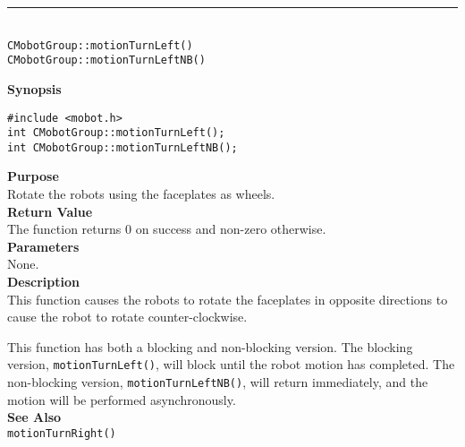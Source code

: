 \noindent
\vspace{5pt}
\rule{4.5in}{0.015in}\\
\noindent
{\LARGE \texttt{CMobotGroup::motionTurnLeft()}}\\
{\LARGE \texttt{CMobotGroup::motionTurnLeftNB()}}\\
{}

\noindent
{\bf Synopsis}
\begin{verbatim}
#include <mobot.h>
int CMobotGroup::motionTurnLeft();
int CMobotGroup::motionTurnLeftNB();
\end{verbatim}

\noindent
{\bf Purpose}\\
Rotate the robots using the faceplates as wheels.\\

\noindent
{\bf Return Value}\\
The function returns 0 on success and non-zero otherwise.\\

\noindent
{\bf Parameters}\\
None.\\

\noindent
{\bf Description}\\
This function causes the robots to rotate the faceplates in opposite directions
to cause the robot to rotate counter-clockwise.

This function has both a blocking and non-blocking version.
The blocking version, \texttt{motionTurnLeft()}, will block until the
robot motion has completed. The non-blocking version, \texttt{motionTurnLeftNB()},
will return immediately, and the motion will be performed asynchronously.\\


\noindent
{\bf See Also}\\
\texttt{motionTurnRight()}


